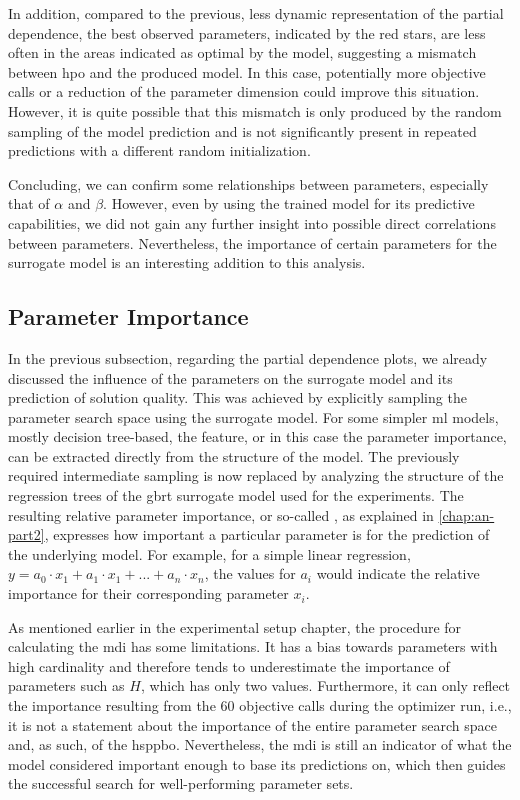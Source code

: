 In addition, compared to the previous, less dynamic representation of the partial dependence, the best observed parameters, indicated by the red stars, are less often in the areas indicated as optimal by the model, suggesting a mismatch between \gls{hpo} and the produced model. In this case, potentially more objective calls or a reduction of the parameter dimension could improve this situation. However, it is quite possible that this mismatch is only produced by the random sampling of the model prediction and is not significantly present in repeated predictions with a different random initialization.

Concluding, we can confirm some relationships between parameters, especially that of $\alpha$ and $\beta$. However, even by using the trained model for its predictive capabilities, we did not gain any further insight into possible direct correlations between parameters. Nevertheless, the importance of certain parameters for the surrogate model is an interesting addition to this analysis.

\subsection{Parameter Importance}
\label{chap:param-importance}

In the previous subsection, regarding the partial dependence plots, we already discussed the influence of the parameters on the surrogate model and its prediction of solution quality. This was achieved by explicitly sampling the parameter search space using the surrogate model. For some simpler \gls{ml} models, mostly decision tree-based, the feature, or in this case the parameter importance, can be  extracted directly from the structure of the model. The previously required intermediate sampling is now replaced by analyzing the structure of the regression trees of the \gls{gbrt} surrogate model used for the experiments. The resulting relative parameter importance, or so-called , as explained in \cref{chap:an-part2}, expresses how important a particular parameter is for the prediction of the underlying model. For example, for a simple linear regression, $y = a_0  \cdot x_1 + a_1 \cdot x_1 + ... + a_n \cdot x_n$, the values for $a_i$ would indicate the relative importance for their corresponding parameter $x_i$. 

As mentioned earlier in the experimental setup chapter, the procedure for calculating the \gls{mdi} has some limitations. It has a bias towards parameters with high cardinality and therefore tends to underestimate the importance of parameters such as $H$, which has only two values. Furthermore, it can only reflect the importance resulting from the 60 objective calls during the optimizer run, i.e., it is not a statement about the importance of the entire parameter search space and, as such, of the \gls{hsppbo}. Nevertheless, the \gls{mdi} is still an indicator of what the model considered important enough to base its predictions on, which then guides the successful search for well-performing parameter sets. 

